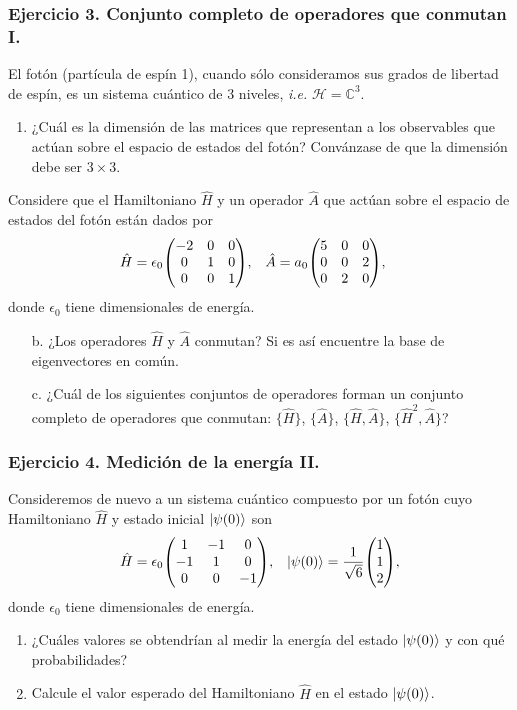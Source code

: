 \documentclass[11pt,letterpaper]{article}
\begin{document}
\subsubsection*{Ejercicio 3. Conjunto completo de operadores que conmutan I.}
El fotón (partícula de espín 1), cuando sólo consideramos sus grados de 
libertad de espín,
es un sistema cuántico de 3 niveles, \textit{i.e.} $\mathcal{H}=\mathbb{C}^3$.
\begin{enumerate}
\item ¿Cuál es la dimensión de las matrices que representan a los observables que 
actúan sobre el espacio de estados del fotón? Convánzase de que la dimensión 
debe ser $3\times 3$.
\end{enumerate}
Considere que el Hamiltoniano $\hat H$ y un operador $\hat A$ que actúan 
sobre el espacio 
de estados del fotón están dados por 
\begin{align}
\hat H&=\epsilon_0\mqty(-2&0&0\\ 0&1&0\\ 0&0&1),
&
\hat A&=a_0\mqty(5&0&0\\ 0&0&2\\ 0&2&0),
\end{align}
donde $\epsilon_0$ tiene dimensionales de energ\'ia.
\begin{enumerate}
\item[b.] ¿Los operadores $\hat H$ y $\hat A$ conmutan? Si es as\'i
encuentre la base de eigenvectores en com\'un.
\item[c.] ¿Cu\'al de los siguientes conjuntos de operadores forman un conjunto 
completo de operadores que conmutan: $\{ \hat H\}$, $\{ \hat A\}$, 
$\{ \hat H, \hat A\}$, $\{ \hat H^2, \hat A \}$?
\end{enumerate}

\subsubsection*{Ejercicio 4. Medición de la energía II.}
Consideremos de nuevo a un sistema cuántico compuesto por un fotón
cuyo Hamiltoniano $\hat H$ y estado inicial $\ket{\psi(0)}$ son
\begin{align}
\hat H&=\epsilon_0\mqty(1&-1&0\\-1&1&0\\0&0&-1),
&
\ket{\psi(0)}=\frac{1}{\sqrt{6}}\mqty(1\\1\\2),
\end{align}
donde $\epsilon_0$ tiene dimensionales de energía. 
\begin{enumerate}
\item ¿Cuáles valores se obtendrían al medir la energía del estado 
$\ket{\psi(0)}$ y con qué probabilidades?
\item Calcule el valor esperado del Hamiltoniano $\hat H$ en el estado 
$\ket{\psi(0)}$.
\end{enumerate}
\end{document}
